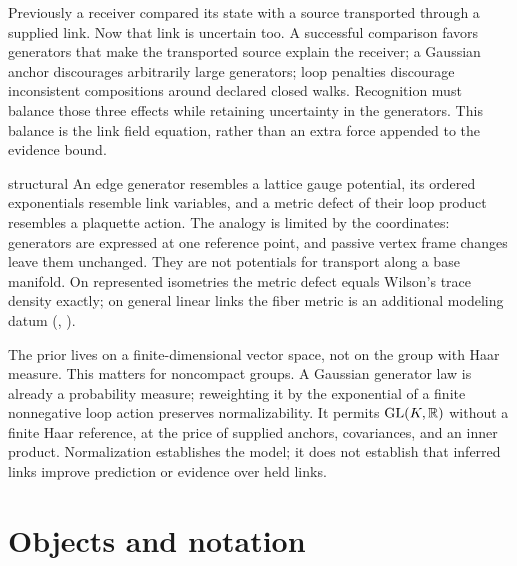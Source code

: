 Previously a receiver compared its state with a source transported through a supplied link.
Now that link is uncertain too. A successful comparison favors generators that make the transported
source explain the receiver; a Gaussian anchor discourages arbitrarily large generators; loop
penalties discourage inconsistent compositions around declared closed walks. Recognition must
balance those three effects while retaining uncertainty in the generators. This balance is the
link field equation, rather than an extra force appended to the evidence bound.

\begin{analogy}{structural}
An edge generator resembles a lattice gauge potential, its ordered exponentials resemble link
variables, and a metric defect of their loop product resembles a plaquette action. The analogy is
limited by the coordinates: generators are expressed at one reference point, and passive vertex
frame changes leave them unchanged. They are not potentials for transport along a base manifold.
On represented isometries the metric defect equals Wilson's trace density exactly; on general
linear links the fiber metric is an additional modeling datum
(, ).
\end{analogy}

The prior lives on a finite-dimensional vector space, not on the group with Haar measure.
This matters for noncompact groups. A Gaussian generator law is already a probability measure;
reweighting it by the exponential of a finite nonnegative loop action preserves normalizability.
It permits $\mathrm{GL}(K,\mathbb R)$ without a finite Haar reference, at the price of supplied anchors,
covariances, and an inner product. Normalization establishes the model; it does not establish
that inferred links improve prediction or evidence over held links.

\section{Objects and notation}
\label{comp:links-notation}

